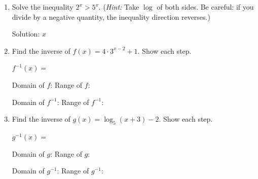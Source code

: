 \documentclass[10pt]{article}
\begin{document}
\vspace{0.08in}

\begin{tcolorbox}[colback=white, colframe=black!40,
    title=\textbf{Tier E --- Extension},
    fonttitle=\bfseries, arc=2mm, left=3mm, right=3mm, top=2mm, bottom=2mm]

\begin{enumerate}[leftmargin=1.8em, itemsep=10pt]

\item Solve the inequality $2^x > 5^x$. (\textit{Hint:} Take $\log$ of both sides.
      Be careful: if you divide by a negative quantity, the inequality direction reverses.)

\vspace{4pt}

Solution: $x$ \blank{4cm}

\item Find the inverse of $f(x) = 4 \cdot 3^{x-2} + 1$. Show each step.

\vspace{4pt}

\vspace{4pt}
$f^{-1}(x) = $ \blank{6cm}

\vspace{6pt}
Domain of $f$: \blank{3.5cm} \qquad Range of $f$: \blank{3.5cm}

\vspace{4pt}
Domain of $f^{-1}$: \blank{3.5cm} \qquad Range of $f^{-1}$: \blank{3.5cm}

\item Find the inverse of $g(x) = \log_5(x+3) - 2$. Show each step.

\vspace{4pt}

\vspace{4pt}
$g^{-1}(x) = $ \blank{6cm}

\vspace{6pt}
Domain of $g$: \blank{3.5cm} \qquad Range of $g$: \blank{3.5cm}

\vspace{4pt}
Domain of $g^{-1}$: \blank{3.5cm} \qquad Range of $g^{-1}$: \blank{3.5cm}

\end{enumerate}
\end{tcolorbox}
\end{document}
